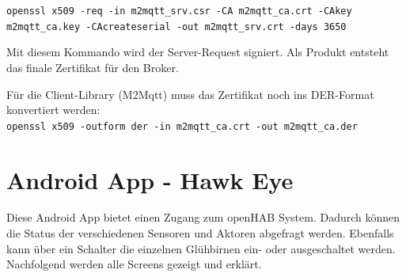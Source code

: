 \lstinline!openssl x509 -req -in m2mqtt_srv.csr -CA m2mqtt_ca.crt -CAkey m2mqtt_ca.key -CAcreateserial -out m2mqtt_srv.crt -days 3650!

Mit diesem Kommando wird der Server-Request signiert. Als Produkt entsteht das finale Zertifikat für den Broker.

Für die Client-Library (M2Mqtt) muss das Zertifikat noch ins DER-Format konvertiert werden: \\
\lstinline!openssl x509 -outform der -in m2mqtt_ca.crt -out m2mqtt_ca.der!

\pagebreak
\section*{Android App - Hawk Eye}
\label{sec:manualAndroidApp}
Diese Android App bietet einen Zugang zum openHAB System. Dadurch können die Status der verschiedenen Sensoren und Aktoren abgefragt werden. Ebenfalls kann über ein Schalter die einzelnen Glühbirnen ein- oder ausgeschaltet werden. Nachfolgend werden alle Screens gezeigt und erklärt.

